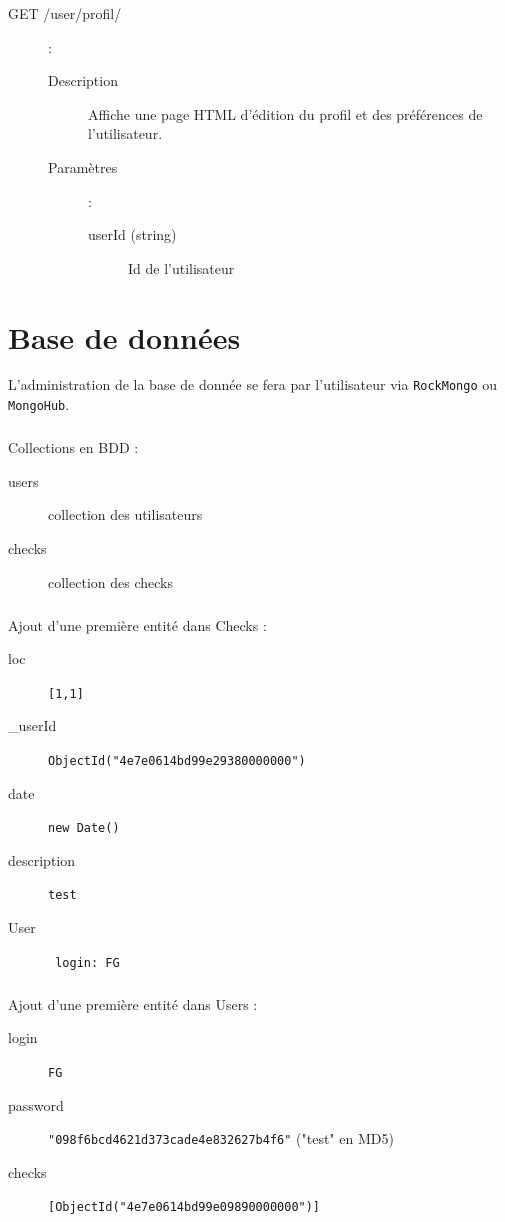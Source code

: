 \documentclass[a4paper,12pt]{report}
\begin{document}
\begin{onehalfspace}
\begin{description}
  \item[GET /user/profil/]:

    \begin{description}
      \item[Description] Affiche une page HTML d'édition du profil et des préférences de l'utilisateur.

      \item[Paramètres]:
        \begin{description}
          \item[userId (string)] Id de l'utilisateur
        \end{description}
    \end{description}

\end{description}

\chapter{Base de données}

L'administration de la base de donnée se fera par l'utilisateur via \lstinline{RockMongo} ou \lstinline{MongoHub}.

\paragraph*{}
Collections en BDD :
\begin{description}
  \item[users] collection des utilisateurs
  \item[checks] collection des checks
\end{description}


\paragraph*{}
Ajout d'une première entité dans Checks :
\begin{description}
  \item[loc] \lstinline{[1,1]}
  \item[\_userId] \lstinline{ObjectId("4e7e0614bd99e29380000000")}
  \item[date] \lstinline{new Date()}
  \item[description] \lstinline{test}
  \item[User] \lstinline{ login: FG }
\end{description}

\paragraph*{}
Ajout d'une première entité dans Users :
\begin{description}
  \item[login] \lstinline{FG}
  \item[password] \lstinline{"098f6bcd4621d373cade4e832627b4f6"} ("test" en MD5)
  \item[checks] \lstinline{[ObjectId("4e7e0614bd99e09890000000")]}
\end{description}


\end{onehalfspace}
\end{document}
